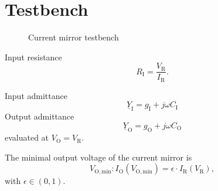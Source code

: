 \documentclass{article}[11pt]
\begin{document}
\section{Testbench}

\begin{figure}[H]
  \centering
  \begin{circuitikz}
    
  \end{circuitikz}
  \caption{Current mirror testbench}
  \label{fig:testbench}
\end{figure}

Input resistance
\begin{equation}
R_{\mathrm{I}} = \frac{V_{\mathrm{R}}}{I_{\mathrm{R}}}.
\end{equation}

Input admittance
\begin{equation}
\underline{Y}_{\mathrm{I}} = g_{\mathrm{I}} + j \omega C_{\mathrm{I}}
\end{equation}
Output admittance
\begin{equation}
\underline{Y}_{\mathrm{O}} = g_{\mathrm{O}} + j \omega C_{\mathrm{O}}
\end{equation}
evaluated at $V_{\mathrm{O}}=V_{\mathrm{R}}$.



The minimal output voltage of the current mirror is
\begin{equation}
V_{\mathrm{O,min}} : I_{\mathrm{O}}\left(V_{\mathrm{O,min}}\right) = \epsilon \cdot I_{\mathrm{R}}\left(V_{\mathrm{R}}\right),
\end{equation}
with $\epsilon \in (0,1)$.



\printbibliography
\end{document}
